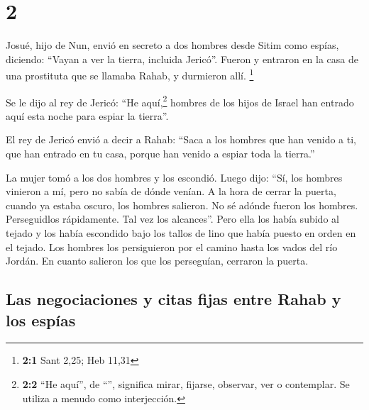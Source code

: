 \hypertarget{section-1}{%
\section{2}\label{section-1}}

 Josué, hijo de Nun, envió en secreto a dos hombres desde
Sitim como espías, diciendo: ``Vayan a ver la tierra, incluida Jericó''.
Fueron y entraron en la casa de una prostituta que se llamaba Rahab, y
durmieron allí. \footnote{\textbf{2:1} Sant 2,25; Heb 11,31}

 Se le dijo al rey de Jericó: ``He aquí,\footnote{\textbf{2:2}
  ``He aquí'', de ``'', significa mirar, fijarse, observar,
  ver o contemplar. Se utiliza a menudo como interjección.} hombres de
los hijos de Israel han entrado aquí esta noche para espiar la tierra''.

 El rey de Jericó envió a decir a Rahab: ``Saca a los
hombres que han venido a ti, que han entrado en tu casa, porque han
venido a espiar toda la tierra.''

 La mujer tomó a los dos hombres y los escondió. Luego
dijo: ``Sí, los hombres vinieron a mí, pero no sabía de dónde venían.
 A la hora de cerrar la puerta, cuando ya estaba oscuro,
los hombres salieron. No sé adónde fueron los hombres. Perseguidlos
rápidamente. Tal vez los alcances''.  Pero ella los había
subido al tejado y los había escondido bajo los tallos de lino que había
puesto en orden en el tejado.  Los hombres los
persiguieron por el camino hasta los vados del río Jordán. En cuanto
salieron los que los perseguían, cerraron la puerta.

\hypertarget{las-negociaciones-y-citas-fijas-entre-rahab-y-los-espuxedas}{%
\subsection{Las negociaciones y citas fijas entre Rahab y los
espías}\label{las-negociaciones-y-citas-fijas-entre-rahab-y-los-espuxedas}}

